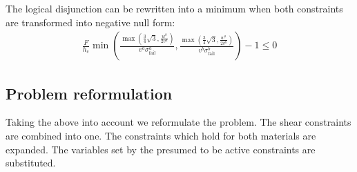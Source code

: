 The logical disjunction can be rewritten into a minimum when both constraints are transformed into negative null form:
\begin{align*}
	\frac{F}{h_\text{c}}  \min{\left( \frac{ \max{\left( \frac34 \sqrt{3}, \frac{w^b}{2v^a} \right)} }{ v^a \sigma^a_\text{fail} }  
		, \frac{ \max{\left( \frac34 \sqrt{3}, \frac{w^a}{2v^b} \right)} }{ v^b \sigma^b_\text{fail} }   \right)} - 1 \le 0  
\end{align*}

\subsection{Problem reformulation}
Taking the above into account we reformulate the problem.
The shear constraints are combined into one.
The constraints which hold for both materials are expanded.
The variables set by the presumed to be active constraints are substituted.

